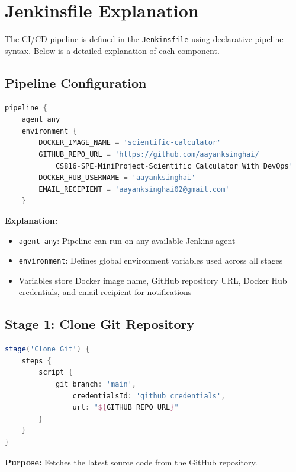 \documentclass[12pt,a4paper]{article}
\begin{document}
\section{Jenkinsfile Explanation}

The CI/CD pipeline is defined in the \texttt{Jenkinsfile} using declarative pipeline syntax. Below is a detailed explanation of each component.

\subsection{Pipeline Configuration}

\begin{lstlisting}[language=Groovy, caption=Pipeline Environment Configuration]
pipeline {
    agent any
    environment {
        DOCKER_IMAGE_NAME = 'scientific-calculator'
        GITHUB_REPO_URL = 'https://github.com/aayanksinghai/
            CS816-SPE-MiniProject-Scientific_Calculator_With_DevOps'
        DOCKER_HUB_USERNAME = 'aayanksinghai'
        EMAIL_RECIPIENT = 'aayanksinghai02@gmail.com'
    }
\end{lstlisting}

\textbf{Explanation:}
\begin{itemize}
    \item \texttt{agent any}: Pipeline can run on any available Jenkins agent
    \item \texttt{environment}: Defines global environment variables used across all stages
    \item Variables store Docker image name, GitHub repository URL, Docker Hub credentials, and email recipient for notifications
\end{itemize}

\subsection{Stage 1: Clone Git Repository}

\begin{lstlisting}[language=Groovy, caption=Git Clone Stage]
stage('Clone Git') {
    steps {
        script {
            git branch: 'main',
                credentialsId: 'github_credentials',
                url: "${GITHUB_REPO_URL}"
        }
    }
}
\end{lstlisting}

\textbf{Purpose:} Fetches the latest source code from the GitHub repository.
\end{document}
